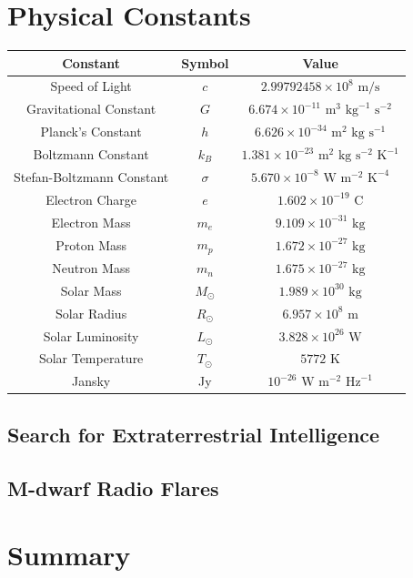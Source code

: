 \documentclass[a4paper,12pt]{article}
\begin{document}
\newpage
\section*{Physical Constants}
\vspace*{\fill}
\begin{table}[H]
        \centering
        \begin{tabular}{|c|c|c|}
                \hline
                Constant & Symbol & Value \\
                \hline
                Speed of Light & $c$ & $2.99792458 \times 10^8 \text{ m/s}$ \\
                Gravitational Constant & $G$ & $6.674 \times 10^{-11} \text{ m}^3 \text{ kg}^{-1} \text{ s}^{-2}$ \\
                Planck's Constant & $h$ & $6.626 \times 10^{-34} \text{ m}^2 \text{ kg} \text{ s}^{-1}$ \\
                Boltzmann Constant & $k_B$ & $1.381 \times 10^{-23} \text{ m}^2 \text{ kg} \text{ s}^{-2} \text{ K}^{-1}$ \\
                Stefan-Boltzmann Constant & $\sigma$ & $5.670 \times 10^{-8} \text{ W} \text{ m}^{-2} \text{ K}^{-4}$ \\
                Electron Charge & $e$ & $1.602 \times 10^{-19} \text{ C}$ \\
                Electron Mass & $m_e$ & $9.109 \times 10^{-31} \text{ kg}$ \\
                Proton Mass & $m_p$ & $1.672 \times 10^{-27} \text{ kg}$ \\
                Neutron Mass & $m_n$ & $1.675 \times 10^{-27} \text{ kg}$ \\
                Solar Mass & $M_\odot$ & $1.989 \times 10^{30} \text{ kg}$ \\
                Solar Radius & $R_\odot$ & $6.957 \times 10^8 \text{ m}$ \\
                Solar Luminosity & $L_\odot$ & $3.828 \times 10^{26} \text{ W}$ \\
                Solar Temperature & $T_\odot$ & $5772 \text{ K}$ \\
                Jansky & Jy & $10^{-26} \text{ W} \text{ m}^{-2} \text{ Hz}^{-1}$ \\
                \hline
        \end{tabular}
\end{table}
\vspace*{\fill}

\newpage




\subsection{Search for Extraterrestrial Intelligence}
\subsection{M-dwarf Radio Flares}

\section{Summary}

\newpage

\newpage
\printindex
\end{document}
